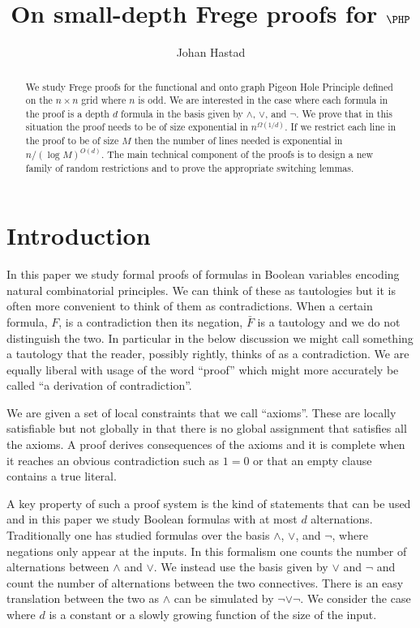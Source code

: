 \documentclass{article}\usepackage[a4paper,margin=20mm]{geometry}
\title{On small-depth Frege proofs for \texorpdfstring{$\PHP$}{PHP}}
\author{Johan Hastad}\date{}
\begin{document}
 
\maketitle

\begin{abstract}
We study Frege proofs for the functional and onto
graph Pigeon Hole Principle
defined on the $n\times n$ grid where $n$ is odd.
We are interested in the case where each formula
in the proof is a depth $d$ formula in the basis given by
$\land$, $\lor$, and $\neg$.  We prove that in this situation the
proof needs to be of size exponential in $n^{\Omega (1/d)}$.
If we restrict each line in the proof to be of
size $M$ then the number of lines needed is exponential
in $n/(\log M)^{O(d)}$.   The main technical component of
the proofs is to design a new family of random restrictions
and to prove the appropriate switching lemmas.
\end{abstract}

\section{Introduction}
In this paper we study formal proofs of formulas in
Boolean variables encoding natural combinatorial principles.
We can think of these as tautologies but it is often
more convenient to think of them as contradictions.
When a certain formula, $F$, is a contradiction then its negation,
$\bar F$ is a tautology and we do not distinguish the two.
In particular in the below discussion we might call something
a tautology that the reader, possibly rightly, thinks of
as a contradiction.  We are equally liberal with usage
of the word ``proof'' which might more accurately be
called ``a derivation of contradiction''.  

We are given a set of local constraints that we call
``axioms''.  These are locally satisfiable but not globally in
that there is no global assignment that satisfies all the axioms.
A proof derives consequences
of the axioms and it is complete when it reaches 
an obvious contradiction such as $1=0$ or that an
empty clause contains a true literal.  

A key property of such a proof system is the kind
of statements that can be used and in
this paper we study Boolean formulas with at most $d$ alternations.
Traditionally one has studied formulas over the basis $\land$,
$\lor$, and $\neg$, where negations only appear at the 
inputs.  In this formalism one counts the number of alternations
between $\land$ and $\lor$.  We instead use the basis given
by $\lor$ and $\neg$ and count the number of alternations between
the two connectives.  There is an easy translation between the
two as $\land$ can be simulated by $\neg \lor \neg$.  We 
consider the case where $d$ is a constant or a slowly growing
function of the size of the input.
\end{document}
